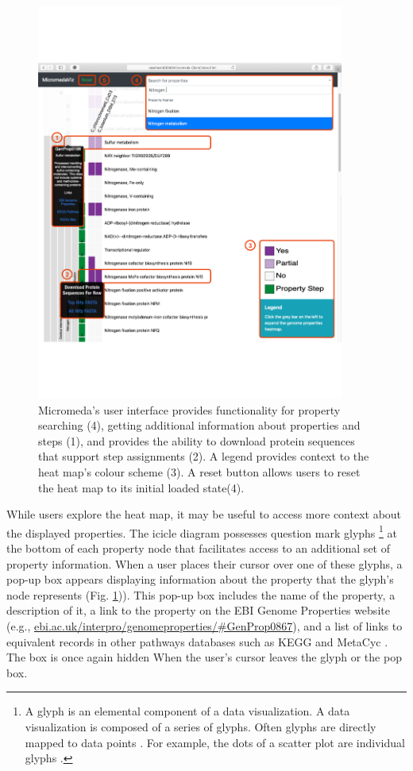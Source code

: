 \begin{figure}[!ht]
  \centering
	\includegraphics[width=0.9\textwidth]{media/micromeda-interface.pdf}
	 \caption{Micromeda's user interface provides functionality for property searching (4), getting additional information about properties and steps (1), and provides the ability to download protein sequences that support step assignments (2). A legend provides context to the heat map's colour scheme (3). A reset button allows users to reset the heat map to its initial loaded state(4).}
	 \label{fig:micromeda-interface}
\end{figure}

While users explore the heat map, it may be useful to access more context about the displayed properties. The icicle diagram possesses question mark glyphs \footnote{A glyph is an elemental component of a data visualization. A data visualization is composed of a series of glyphs. Often glyphs are directly mapped to data points \cite{chen}. For example, the dots of a scatter plot are individual glyphs \cite{chen}.} at the bottom of each property node that facilitates access to an additional set of property information. When a user places their cursor over one of these glyphs, a pop-up box appears displaying information about the property that the glyph's node represents (Fig. \ref{fig:micromeda-interface})). This pop-up box includes the name of the property, a description of it, a link to the property on the EBI Genome Properties website (e.g., \href{ebi.ac.uk/interpro/genomeproperties/\#GenProp0867}{ebi.ac.uk/interpro/genomeproperties/\#GenProp0867}), and a list of links to equivalent records in other pathways databases such as KEGG \cite{kanehisa2000kegg} and MetaCyc \cite{karp2002metacyc}. The box is once again hidden When the user's cursor leaves the glyph or the pop box.

